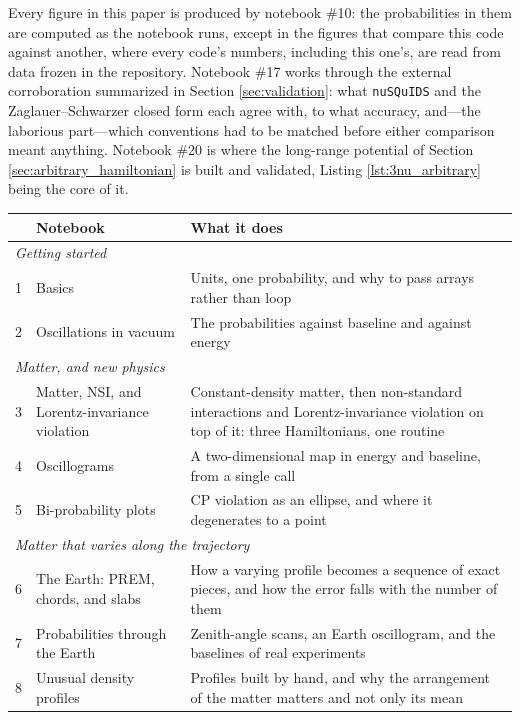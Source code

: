 \documentclass[final,5p,times,twocolumn,sort,compress]{elsarticle}
\begin{document}
Every figure in this paper is produced by notebook \#10: the probabilities in them are computed as the notebook runs, except in the figures that compare this code against another, where every code's numbers, including this one's, are read from data frozen in the repository.  Notebook \#17 works through the external corroboration summarized in Section \ref{sec:validation}: what {\tt nuSQuIDS} and the Zaglauer--Schwarzer closed form each agree with, to what accuracy, and---the laborious part---which conventions had to be matched before either comparison meant anything.  Notebook \#20 is where the long-range potential of Section \ref{sec:arbitrary_hamiltonian} is built and validated, Listing \ref{lst:3nu_arbitrary} being the core of it.

{\def\arraystretch{1.1}
\begin{table}[t!]
  {\small
  \begin{tabular}{rlp{9.2cm}}
   & Notebook & What it does \\
   \hline
   \multicolumn{3}{l}{\emph{Getting started}} \\
   1 & Basics & Units, one probability, and why to pass arrays rather than loop \\
   2 & Oscillations in vacuum & The probabilities against baseline and against energy \\
   \multicolumn{3}{l}{\emph{Matter, and new physics}} \\
   3 & Matter, NSI, and Lorentz-invariance violation & Constant-density matter, then non-standard interactions and Lorentz-invariance violation on top of it: three Hamiltonians, one routine \\
   4 & Oscillograms & A two-dimensional map in energy and baseline, from a single call \\
   5 & Bi-probability plots & CP violation as an ellipse, and where it degenerates to a point \\
   \multicolumn{3}{l}{\emph{Matter that varies along the trajectory}} \\
   6 & The Earth: PREM, chords, and slabs & How a varying profile becomes a sequence of exact pieces, and how the error falls with the number of them \\
   7 & Probabilities through the Earth & Zenith-angle scans, an Earth oscillogram, and the baselines of real experiments \\
   8 & Unusual density profiles & Profiles built by hand, and why the arrangement of the matter matters and not only its mean \\

\end{tabular}}
\end{table}}
\end{document}
